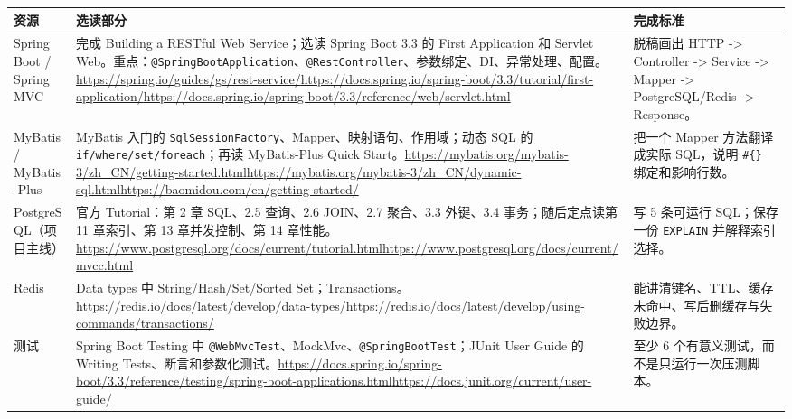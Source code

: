 \documentclass[a4paper,11pt]{article}
\begin{document}
\begin{longtable}{>{\raggedright\arraybackslash}p{} >{\raggedright\arraybackslash}p{} >{\raggedright\arraybackslash}p{}}
\textbf{资源} & \textbf{选读部分} & \textbf{完成标准} \\
\hline
Spring Boot / Spring MVC & 完成 Building a RESTful Web Service；选读 Spring Boot 3.3 的 First Application 和 Servlet Web。重点：\texttt{@SpringBootApplication}、\texttt{@RestController}、参数绑定、DI、异常处理、配置。\newline \url{https://spring.io/guides/gs/rest-service/}\newline \url{https://docs.spring.io/spring-boot/3.3/tutorial/first-application/}\newline \url{https://docs.spring.io/spring-boot/3.3/reference/web/servlet.html} & 脱稿画出 HTTP -> Controller -> Service -> Mapper -> PostgreSQL/Redis -> Response。 \\
MyBatis / MyBatis-Plus & MyBatis 入门的 \texttt{SqlSessionFactory}、Mapper、映射语句、作用域；动态 SQL 的 \texttt{if/where/set/foreach}；再读 MyBatis-Plus Quick Start。\newline \url{https://mybatis.org/mybatis-3/zh_CN/getting-started.html}\newline \url{https://mybatis.org/mybatis-3/zh_CN/dynamic-sql.html}\newline \url{https://baomidou.com/en/getting-started/} & 把一个 Mapper 方法翻译成实际 SQL，说明 \texttt{\#\{\}} 绑定和影响行数。 \\
PostgreSQL（项目主线） & 官方 Tutorial：第 2 章 SQL、2.5 查询、2.6 JOIN、2.7 聚合、3.3 外键、3.4 事务；随后定点读第 11 章索引、第 13 章并发控制、第 14 章性能。\newline \url{https://www.postgresql.org/docs/current/tutorial.html}\newline \url{https://www.postgresql.org/docs/current/mvcc.html} & 写 5 条可运行 SQL；保存一份 \texttt{EXPLAIN} 并解释索引选择。 \\
Redis & Data types 中 String/Hash/Set/Sorted Set；Transactions。\newline \url{https://redis.io/docs/latest/develop/data-types/}\newline \url{https://redis.io/docs/latest/develop/using-commands/transactions/} & 能讲清键名、TTL、缓存未命中、写后删缓存与失败边界。 \\
测试 & Spring Boot Testing 中 \texttt{@WebMvcTest}、MockMvc、\texttt{@SpringBootTest}；JUnit User Guide 的 Writing Tests、断言和参数化测试。\newline \url{https://docs.spring.io/spring-boot/3.3/reference/testing/spring-boot-applications.html}\newline \url{https://docs.junit.org/current/user-guide/} & 至少 6 个有意义测试，而不是只运行一次压测脚本。 \\

\end{longtable}
\end{document}
